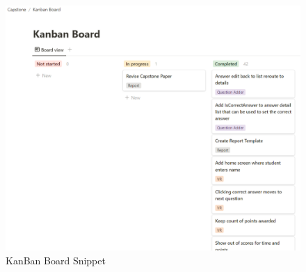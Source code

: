 \begin{figure}[htb]
	\centering
	\includegraphics[width=.6\textwidth]{Requirements/assets/KanBan-Board.png}
	\caption[KanBan Board Snippet]{\label{KanBan}KanBan Board Snippet}
\end{figure}

